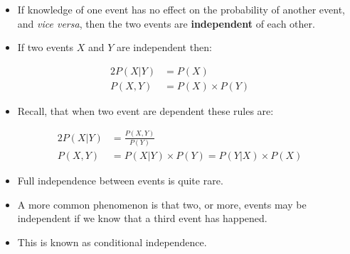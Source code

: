 \documentclass[xcolor={table}]{beamer}
\newcommand{\keyword}[1]{\alert{\textbf{#1}}\index{#1}}
\begin{document}
\begin{frame} 
\begin{itemize}
\item If knowledge of one event has no effect on the probability of another event, and \emph{vice versa}, then the two events are \keyword{independent} of each other. 
\item If two events $X$ and $Y$ are independent then:
\end{itemize}
\begin{alignat*}{2}
P(X|Y)&=P(X)\\
P(X,Y)&=P(X) \times P(Y)
\end{alignat*}
\begin{block}{}
\begin{itemize}
	\item Recall, that when two event are dependent these rules are:
\end{itemize}
\begin{alignat*}{2}
P(X|Y)&=\displaystyle \frac{P(X,Y)}{P(Y)}\\
P(X,Y)&=P(X|Y) \times P(Y)=P(Y|X) \times P(X)
\end{alignat*}
\end{block}

\end{frame} 


\begin{frame} 
\begin{itemize}
\item \indent Full independence between events is quite rare. 
\item A more common phenomenon is that two, or more, events may be independent if we know that a third event has happened. 
\item This is known as \alert{conditional independence}. 
\end{itemize}
\end{frame} 
\end{document}

